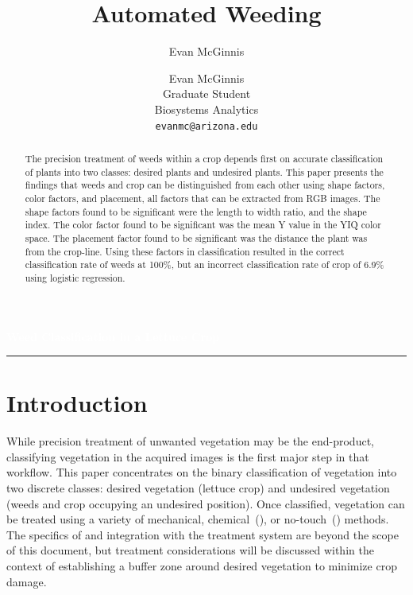 \documentclass[letterpaper]{article}
\author{Evan McGinnis}
\title{Automated Weeding}
\author{%
    Evan McGinnis \\
    Graduate Student \\
    Biosystems Analytics \\
    \texttt{evanmc@arizona.edu}\vspace{40pt} \\
    }
\makeatletter
\def\printauthor{%
    {\large \@author}}
\makeatother
\begin{document}
\begin{titlepage}
\BgThispage
{}
\vspace*{1cm}
\noindent
\textcolor{white}{\Huge\textbf{\textsf{Weed Classification in a Lettuce Crop}}}
\vspace*{3.5cm}\par
\noindent
\begin{minipage}{0.35\linewidth}
    \begin{flushright}
        \printauthor
    \end{flushright}
\end{minipage} \hspace{15pt}
%
\begin{minipage}{0.02\linewidth}
    \rule{1pt}{175pt}
\end{minipage} \hspace{-10pt}
%
\begin{minipage}{0.70\linewidth}
\vspace{5pt}
    \begin{abstract} 
The precision treatment of weeds within a crop depends first on accurate classification of plants into two classes: desired plants and undesired plants. This paper presents the findings that weeds and crop can be distinguished from each other using shape factors, color factors, and placement, all factors that can be extracted from RGB images. The shape factors found to be significant were the length to width ratio, and the shape index. The color factor found to be significant was the mean Y value in the YIQ color space. The placement factor found to be significant was the distance the plant was from the crop-line. Using these factors in classification resulted in the correct classification rate of weeds at 100\%, but an incorrect classification rate of crop of 6.9\% using logistic regression.
    \end{abstract}
\end{minipage}
\end{titlepage}
\restoregeometry
%
%
\tableofcontents
\listoffigures
\listoftables
\newpage

%
%



\section{Introduction}
While precision treatment of unwanted vegetation may be the end-product, classifying vegetation in the acquired images is the first major step in that workflow. This paper concentrates on the binary classification of vegetation into two discrete classes: desired vegetation (lettuce crop) and undesired vegetation (weeds and crop occupying an undesired position). Once classified, vegetation can be treated using a variety of mechanical, chemical~(\cite{Saile2022-vu}), or no-touch~(\cite{Saile2022-vu,Mwitta2022-yt}) methods. The specifics of and integration with the treatment system are beyond the scope of this document, but treatment considerations will be discussed within the context of establishing a buffer zone around desired vegetation to minimize crop damage.
\end{document}
